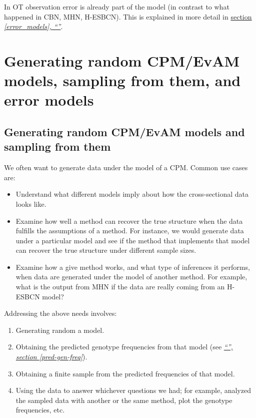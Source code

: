 \documentclass[a4paper,11pt]{article}
\newcommand*{\qrefP}[1]{\hyperref[{#1}]{\textit{``\nameref*{#1}'', section \ref*{#1}}}}
\newcommand*{\qrefS}[1]{\hyperref[{#1}]{section \textit{\ref*{#1},
      ``\nameref*{#1}''}}}
\begin{document}
In OT observation error is already part of the model  (in contrast to what happened in CBN, MHN, H-ESBCN). This is explained in more detail in \qrefS{error_models}.

\section{Generating random CPM/EvAM models, sampling from them, and error models}\label{sec:random_evam}


\subsection{Generating random CPM/EvAM models and sampling from them}\label{subsec:random_evam}
We often want to generate data under the model of a CPM. Common use cases are:

\begin{itemize}
\item Understand what different models imply about how the cross-sectional data looks like.

\item Examine how well a method can recover the true structure when the data fulfills the assumptions of a method. For instance, we would generate data under a particular model and see if the method that implements that model can recover the true structure under different sample sizes.

\item Examine how a give method works, and what type of inferences it performs, when data are generated under the model of another method. For example, what is the output from MHN if the data are really coming from an H-ESBCN model?
\end{itemize}


Addressing the above needs involves:


\begin{enumerate}
\item Generating random a model.
 
\item Obtaining the predicted genotype frequencies from that model (see \qrefP{pred-gen-freq}).
 
\item Obtaining a finite sample from the predicted frequencies of that model.
  
\item Using the data to answer whichever questions we had; for example, analyzed the sampled data with another or the same method, plot the genotype frequencies, etc.
  
\end{enumerate}
\end{document}
